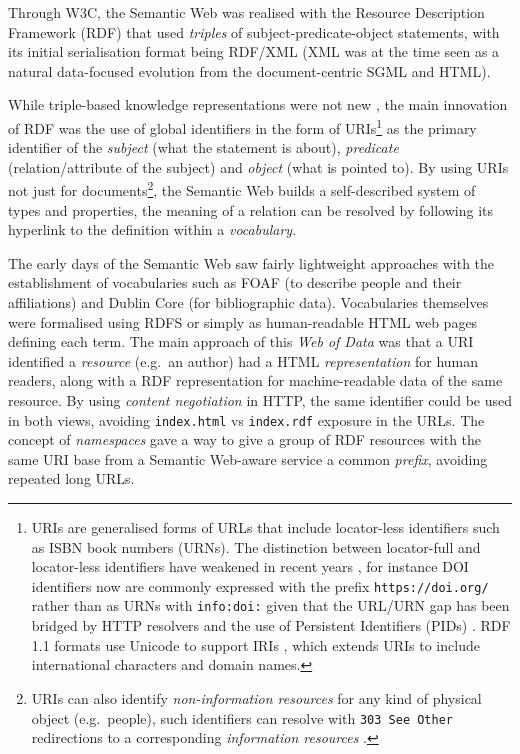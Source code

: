 Through W3C, the Semantic Web was realised with the Resource Description Framework (RDF) \cite{w3-rdf11-primer} that used \emph{triples} of subject-predicate-object statements, with its initial serialisation format \cite{w3-rdf-syntax} being RDF/XML (XML was at the time seen as a natural data-focused evolution from the document-centric SGML and HTML).

While triple-based knowledge representations were not new \cite{stanczykProcessModellingInformation1987}, the main innovation of RDF was the use of global identifiers in the form of URIs\footnote{URIs \cite{rfc3986} are generalised forms of URLs that include locator-less identifiers such as ISBN book numbers (URNs). The distinction between locator-full and locator-less identifiers have weakened in recent years \cite{InfoURIRegistry}, for instance DOI identifiers now are commonly expressed with the prefix \texttt{https://doi.org/} rather than as URNs with \texttt{info:doi:} given that the URL/URN gap has been bridged by HTTP resolvers and the use of Persistent Identifiers (PIDs) \cite{jutyIdentifiersOrgMIRIAM2011}. RDF 1.1 formats use Unicode to support IRIs \cite{rfc3987}, which extends URIs to include international characters and domain names.} as the primary identifier of the \emph{subject} (what the statement is about), \emph{predicate} (relation/attribute of the subject) and \emph{object} (what is pointed to). By using URIs not just for documents\footnote{URIs can also identify \emph{non-information resources} for any kind of physical object (e.g.~people), such identifiers can resolve with \texttt{303\ See\ Other} redirections to a corresponding \emph{information resources} \cite{sauermannCoolURIsSemantic2011}.}, the Semantic Web builds a self-described system of types and properties, the meaning of a relation can be resolved by following its hyperlink to the definition within a \emph{vocabulary}.

The early days of the Semantic Web saw fairly lightweight approaches with the establishment of vocabularies such as FOAF (to describe people and their affiliations) and Dublin Core (for bibliographic data). Vocabularies themselves were formalised using RDFS or simply as human-readable HTML web pages defining each term. The main approach of this \emph{Web of Data} was that a URI identified a \emph{resource} (e.g.~an author) had a HTML \emph{representation} for human readers, along with a RDF representation for machine-readable data of the same resource. By using \emph{content negotiation} in HTTP, the same identifier could be used in both views, avoiding \texttt{index.html} vs \texttt{index.rdf} exposure in the URLs. The concept of \emph{namespaces} gave a way to give a group of RDF resources with the same URI base from a Semantic Web-aware service a common \emph{prefix}, avoiding repeated long URLs.


